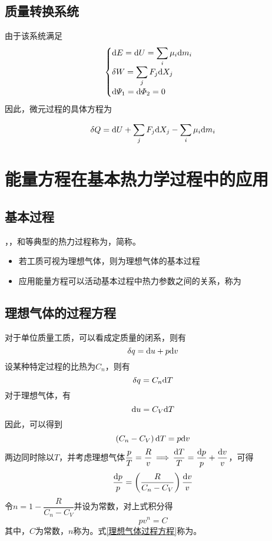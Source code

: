 \subsection{质量转换系统}
由于该系统满足
\begin{equation}
	\begin{cases}
		\displaystyle {\rm{d}} E = {\rm{d}} U = \sum_i \mu_i {\rm{d}} m_i\\
		\displaystyle \delta W = \sum_j F_j {\rm{d}} X_j\\
		{\rm{d}} \varPsi_1 = {\rm{d}} \varPhi_2 = 0
	\end{cases}
\end{equation}
因此，微元过程的具体方程为
\begin{itemizea}
	\item 
	\begin{equation}
		\delta Q = {\rm{d}} U + \sum_j F_j {\rm{d}} X_j - \sum_i \mu_i {\rm{d}} m_i
	\end{equation}
\end{itemizea}


\section{能量方程在基本热力学过程中的应用}
\subsection{基本过程}
\tdefination[基本过程]
，，和等典型的热力过程称为，简称。

\begin{itemize}
	\item 若工质可视为理想气体，则为理想气体的基本过程
	\item 应用能量方程可以活动基本过程中热力参数之间的关系，称为
\end{itemize}

\subsection{理想气体的过程方程}
对于单位质量工质，可以看成定质量的闭系，则有
\[
\delta q = {\rm{d}} u + p {\rm{d}} v
\]
设某种特定过程的比热为$C_n$，则有
\[
\delta q = C_n {\rm{d}} T
\]
对于理想气体，有
\[
{\rm{d}} u = C_V {\rm{d}} T
\]
因此，可以得到
\[
\left(C_n - C_V\right){\rm{d}} T = p {\rm{d}} v
\]
两边同时除以$T$，并考虑理想气体$\dfrac{p}{T} = \dfrac{R}{v} \, \Longrightarrow \, \dfrac{{\rm{d}} T}{T} = \dfrac{{\rm{d}} p}{p} + \dfrac{{\rm{d}} v}{v}$，可得
\begin{equation}
	\dfrac{{\rm{d}} p}{p} = \left(\frac{R}{C_n - C_V}\right)\frac{{\rm{d}} v}{v}
\end{equation}
令$n = 1 - \dfrac{R}{C_n - C_V}$并设为常数，对上式积分得
\begin{equation}
	pv^n = C
	\label{理想气体过程方程}
\end{equation}
其中，$C$为常数，$n$称为。式\eqref{理想气体过程方程}称为。

